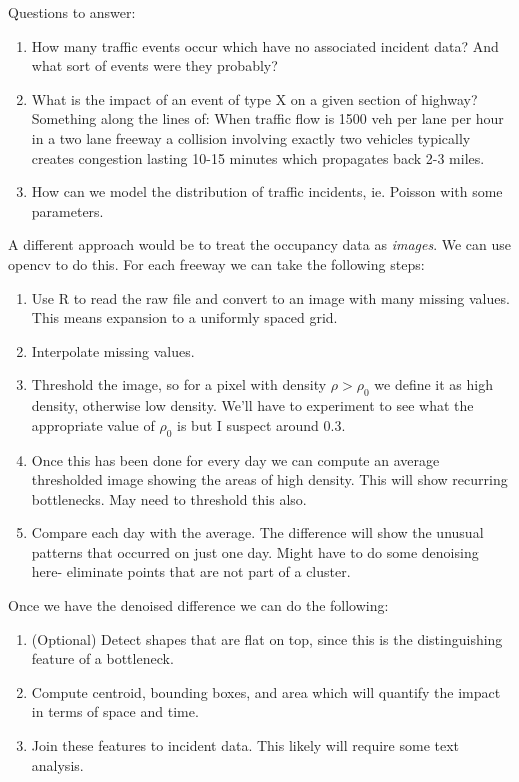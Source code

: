 \documentclass[12pt]{article}
\begin{document}
Questions to answer:
\begin{enumerate}
    \item How many traffic events occur which have no associated incident
        data? And what sort of events were they probably?
    \item What is the impact of an event of type X on a given section of
        highway? Something along the lines of: When traffic flow is 1500
        veh per lane per hour in a two lane freeway a collision involving
        exactly two vehicles typically creates congestion lasting 10-15
        minutes which propagates back 2-3 miles. 
    \item How can we model the distribution of traffic incidents, ie.
        Poisson with some parameters.
\end{enumerate}



A different approach would be to treat the occupancy data as \emph{images}.
We can use opencv to do this. For each freeway we can take the following
steps:
\begin{enumerate}
    \item Use R to read the raw file and convert to an image with many missing
        values. This means expansion to a uniformly spaced grid.
    \item Interpolate missing values. 
    \item Threshold the image, so for a pixel with density $\rho >
        \rho_0$
        we define it as high density, otherwise low density. We'll
        have to experiment to see what the appropriate value of $\rho_0$ is
        but I suspect around 0.3.
    \item Once this has been done for every day we can compute an average
        thresholded image showing the areas of high density. This will show
        recurring bottlenecks. May need to threshold this also.
    \item Compare each day with the average. The difference will show the
        unusual patterns that occurred on just one day. Might have to do
        some denoising here- eliminate points that are not part of a 
        cluster.
\end{enumerate}

Once we have the denoised difference we can do the following:
\begin{enumerate}
    \item (Optional) Detect shapes that are flat on top, since this is the
        distinguishing feature of a bottleneck.
    \item Compute centroid, bounding boxes, and area which will quantify the impact
        in terms of space and time.
    \item Join these features to incident data. This likely will require some text
        analysis.
\end{enumerate}
\end{document}
